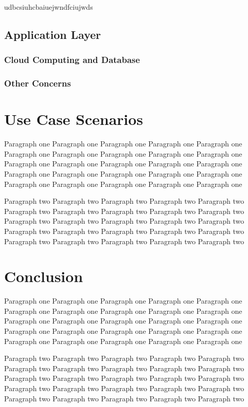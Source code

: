 \documentclass[10pt,journal,final,a4paper,nofonttune]{IEEEtran}
\begin{document}
udbcsiuhcbaiuejwndfciujwds


\subsection{Application Layer}


\subsubsection{Cloud Computing and Database}

\subsubsection{Other Concerns}


\section{Use Case Scenarios}
Paragraph one Paragraph one Paragraph one Paragraph one Paragraph one 
Paragraph one Paragraph one Paragraph one Paragraph one Paragraph one 
Paragraph one Paragraph one Paragraph one Paragraph one Paragraph one 
Paragraph one Paragraph one Paragraph one Paragraph one Paragraph one 
Paragraph one Paragraph one Paragraph one Paragraph one Paragraph one 

Paragraph two Paragraph two Paragraph two Paragraph two Paragraph two 
Paragraph two Paragraph two Paragraph two Paragraph two Paragraph two 
Paragraph two Paragraph two Paragraph two Paragraph two Paragraph two 
Paragraph two Paragraph two Paragraph two Paragraph two Paragraph two 
Paragraph two Paragraph two Paragraph two Paragraph two Paragraph two 

\section{Conclusion}

Paragraph one Paragraph one Paragraph one Paragraph one Paragraph one 
Paragraph one Paragraph one Paragraph one Paragraph one Paragraph one 
Paragraph one Paragraph one Paragraph one Paragraph one Paragraph one 
Paragraph one Paragraph one Paragraph one Paragraph one Paragraph one 
Paragraph one Paragraph one Paragraph one Paragraph one Paragraph one 

Paragraph two Paragraph two Paragraph two Paragraph two Paragraph two 
Paragraph two Paragraph two Paragraph two Paragraph two Paragraph two 
Paragraph two Paragraph two Paragraph two Paragraph two Paragraph two 
Paragraph two Paragraph two Paragraph two Paragraph two Paragraph two 
Paragraph two Paragraph two Paragraph two Paragraph two Paragraph two 
\end{document}
